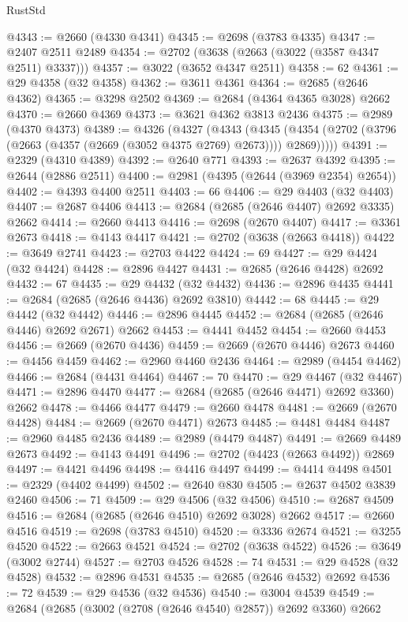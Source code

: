 \begin{lexlean}{RustStd}
\begin{coremodule}
@4343 := @2660 (@4330 @4341)
@4345 := @2698 (@3783 @4335)
@4347 := @2407 @2511 @2489
@4354 := @2702 (@3638 (@2663 (@3022 (@3587 @4347 @2511) @3337)))
@4357 := @3022 (@3652 @4347 @2511)
@4358 := 62
@4361 := @29 @4358 (@32 @4358)
@4362 := @3611 @4361
@4364 := @2685 (@2646 @4362)
@4365 := @3298 @2502
@4369 := @2684 (@4364 @4365 @3028) @2662
@4370 := @2660 @4369
@4373 := @3621 @4362 @3813 @2436
@4375 := @2989 (@4370 @4373)
@4389 := @4326
    (@4327
      (@4343
        (@4345 (@4354 (@2702 (@3796 (@2663 (@4357 (@2669 (@3052 @4375 @2769) @2673)))) @2869)))))
@4391 := @2329 (@4310 @4389)
@4392 := @2640 @771
@4393 := @2637 @4392
@4395 := @2644 (@2886 @2511)
@4400 := @2981 (@4395 (@2644 (@3969 @2354) @2654))
@4402 := @4393 @4400 @2511
@4403 := 66
@4406 := @29 @4403 (@32 @4403)
@4407 := @2687 @4406
@4413 := @2684 (@2685 (@2646 @4407) @2692 @3335) @2662
@4414 := @2660 @4413
@4416 := @2698 (@2670 @4407)
@4417 := @3361 @2673
@4418 := @4143 @4417
@4421 := @2702 (@3638 (@2663 @4418))
@4422 := @3649 @2741
@4423 := @2703 @4422
@4424 := 69
@4427 := @29 @4424 (@32 @4424)
@4428 := @2896 @4427
@4431 := @2685 (@2646 @4428) @2692
@4432 := 67
@4435 := @29 @4432 (@32 @4432)
@4436 := @2896 @4435
@4441 := @2684 (@2685 (@2646 @4436) @2692 @3810)
@4442 := 68
@4445 := @29 @4442 (@32 @4442)
@4446 := @2896 @4445
@4452 := @2684 (@2685 (@2646 @4446) @2692 @2671) @2662
@4453 := @4441 @4452
@4454 := @2660 @4453
@4456 := @2669 (@2670 @4436)
@4459 := @2669 (@2670 @4446) @2673
@4460 := @4456 @4459
@4462 := @2960 @4460 @2436
@4464 := @2989 (@4454 @4462)
@4466 := @2684 (@4431 @4464)
@4467 := 70
@4470 := @29 @4467 (@32 @4467)
@4471 := @2896 @4470
@4477 := @2684 (@2685 (@2646 @4471) @2692 @3360) @2662
@4478 := @4466 @4477
@4479 := @2660 @4478
@4481 := @2669 (@2670 @4428)
@4484 := @2669 (@2670 @4471) @2673
@4485 := @4481 @4484
@4487 := @2960 @4485 @2436
@4489 := @2989 (@4479 @4487)
@4491 := @2669 @4489 @2673
@4492 := @4143 @4491
@4496 := @2702 (@4423 (@2663 @4492)) @2869
@4497 := @4421 @4496
@4498 := @4416 @4497
@4499 := @4414 @4498
@4501 := @2329 (@4402 @4499)
@4502 := @2640 @830
@4505 := @2637 @4502 @3839 @2460
@4506 := 71
@4509 := @29 @4506 (@32 @4506)
@4510 := @2687 @4509
@4516 := @2684 (@2685 (@2646 @4510) @2692 @3028) @2662
@4517 := @2660 @4516
@4519 := @2698 (@3783 @4510)
@4520 := @3336 @2674
@4521 := @3255 @4520
@4522 := @2663 @4521
@4524 := @2702 (@3638 @4522)
@4526 := @3649 (@3002 @2744)
@4527 := @2703 @4526
@4528 := 74
@4531 := @29 @4528 (@32 @4528)
@4532 := @2896 @4531
@4535 := @2685 (@2646 @4532) @2692
@4536 := 72
@4539 := @29 @4536 (@32 @4536)
@4540 := @3004 @4539
@4549 := @2684 (@2685 (@3002 (@2708 (@2646 @4540) @2857)) @2692 @3360) @2662

\end{coremodule}
\end{lexlean}
